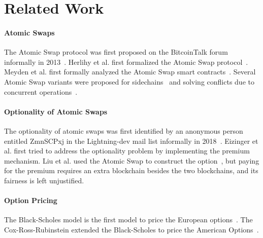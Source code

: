 \section{Related Work}
\label{sec:related_work}

\paragraph{Atomic Swaps}
The Atomic Swap protocol was first proposed on the BitcoinTalk forum informally in 2013~\cite{nolan2013alt}.
Herlihy et al. first formalized the Atomic Swap protocol~\cite{herlihy2018atomic}.
Meyden et al. first formally analyzed the Atomic Swap smart contracts~\cite{van2018specification}.
Several Atomic Swap variants were proposed for sidechains~\cite{robinson2019atomic} and solving conflicts due to concurrent operations~\cite{zakhary2019atomic}.

\paragraph{Optionality of Atomic Swaps}
The optionality of atomic swaps was first identified by an anonymous person entitled ZmnSCPxj in the Lightning-dev mail list informally in 2018~\cite{optionality-origin}.
Eizinger et al. first tried to address the optionality problem by implementing the premium mechanism\cite{first-attempt-optionality}.
Liu et al. used the Atomic Swap to construct the option~\cite{liu2018atomic}, but paying for the premium requires an extra blockchain besides the two blockchains, and its fairness is left unjustified.

\paragraph{Option Pricing}
The Black-Scholes model is the first model to price the European options~\cite{black1973pricing}.
The Cox-Ross-Rubinstein extended the Black-Scholes to price the American Options~\cite{cox1979option}.